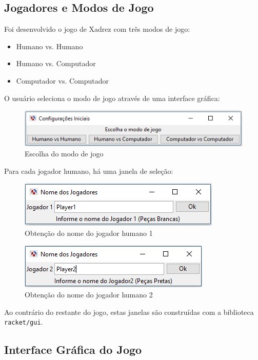 	\subsection{Jogadores e Modos de Jogo}
	Foi desenvolvido o jogo de Xadrez com três modos de jogo:
	\begin{itemize}
		\item Humano vs. Humano
		\item Humano vs. Computador
		\item Computador vs. Computador
	\end{itemize}

	O usuário seleciona o modo de jogo através de uma interface gráfica:
	\begin{figure}[h]
		\centering
		\includegraphics[scale = 0.7]{escolha.png}
		\caption{Escolha do modo de jogo}
	\end{figure}

	Para cada jogador humano, há uma janela de seleção:
	\begin{figure}[h]
		\centering
		\includegraphics[scale = 0.7]{player1.png}
		\caption{Obtenção do nome do jogador humano 1}
	\end{figure}
	\begin{figure}[h]
		\centering
		\includegraphics[scale = 0.7]{player2.png}
		\caption{Obtenção do nome do jogador humano 2}
	\end{figure}

	Ao contrário do restante do jogo, estas janelas são construídas com a biblioteca \verb|racket/gui|.

	\subsection{Interface Gráfica do Jogo}

